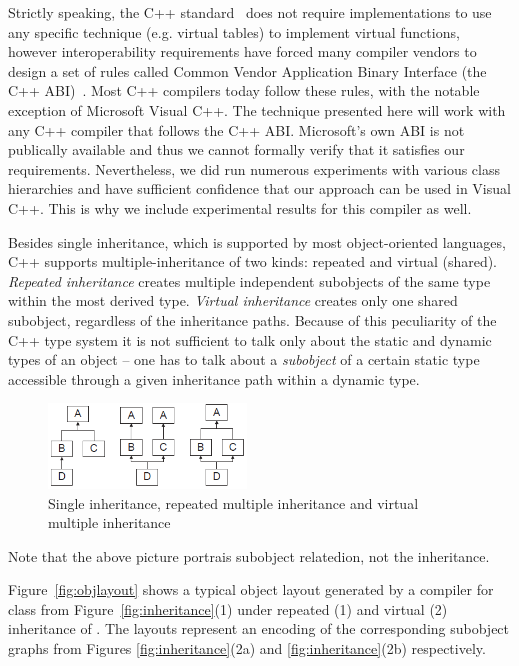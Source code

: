 Strictly speaking, the C++ standard~\cite{C++0x} does not require implementations 
to use any specific technique (e.g. virtual tables) to implement virtual functions, 
however interoperability requirements have forced many compiler vendors to design a 
set of rules called Common Vendor Application Binary Interface (the C++ 
ABI)~\cite{C++ABI}. Most C++ compilers today follow these rules, with the 
notable exception of Microsoft Visual C++. The technique presented here will 
work with any C++ compiler that follows the C++ ABI. Microsoft's own ABI is not 
publically available and thus we cannot formally verify that it satisfies 
our requirements. Nevertheless, we did run numerous experiments with various 
class hierarchies and have sufficient confidence that our approach can be used 
in Visual C++. This is why we include experimental results for this compiler as 
well.

Besides single inheritance, which is supported by most object-oriented languages, 
C++ supports multiple-inheritance of two kinds: repeated and virtual (shared). 
\emph{Repeated inheritance} creates multiple independent subobjects of the same 
type within the most derived type. \emph{Virtual inheritance} creates only one 
shared subobject, regardless of the inheritance paths. Because of this 
peculiarity of the C++ type system it is not sufficient to talk only about the 
static and dynamic types of an object -- one has to talk about a 
\emph{subobject} of a certain static type accessible through a given inheritance 
path within a dynamic type.

\begin{figure}[tbp]
  \centering
    \includegraphics[width=0.47\textwidth]{Hierarchies.png}
  \caption{Single inheritance, repeated multiple inheritance and virtual multiple inheritance}
  \label{fig:hierarchy}
\end{figure}

\noindent
Note that the above picture portrais subobject relatedion, not the inheritance.

Figure~\ref{fig:objlayout} shows a typical object layout generated by a \Cpp{} 
compiler for class  from Figure~\ref{fig:inheritance}(1) under repeated 
(1) and virtual (2) inheritance of . The layouts represent an encoding 
of the corresponding subobject graphs from Figures \ref{fig:inheritance}(2a) and 
\ref{fig:inheritance}(2b) respectively.

